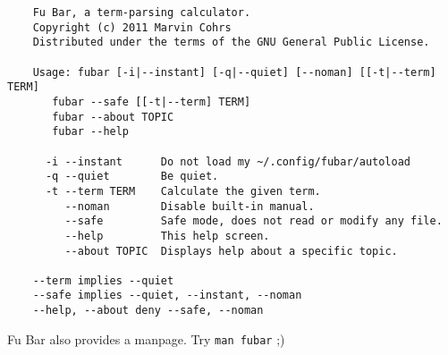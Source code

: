 \documentclass[12pt,a4paper]{article}
\begin{document}
	\begin{verbatim}
	Fu Bar, a term-parsing calculator.
	Copyright (c) 2011 Marvin Cohrs
	Distributed under the terms of the GNU General Public License.

	Usage: fubar [-i|--instant] [-q|--quiet] [--noman] [[-t|--term] TERM]
       fubar --safe [[-t|--term] TERM]
       fubar --about TOPIC
       fubar --help

	  -i --instant      Do not load my ~/.config/fubar/autoload
	  -q --quiet        Be quiet.
	  -t --term TERM    Calculate the given term.
	     --noman        Disable built-in manual.
	     --safe         Safe mode, does not read or modify any file.
	     --help         This help screen.
	     --about TOPIC  Displays help about a specific topic.
     
	--term implies --quiet
	--safe implies --quiet, --instant, --noman
	--help, --about deny --safe, --noman
	\end{verbatim}
	
	Fu Bar also provides a manpage. Try \texttt{man fubar} ;)
\end{document}
